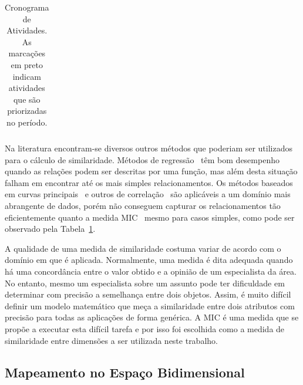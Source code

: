 \begin{table}
    \caption[Cronograma de atividades]{Cronograma de Atividades. As marcações em preto        indicam atividades que são priorizadas no período.}
    \begin{center}
        \begin{tabular}{|c|c|c|c|c|c|c|}
        \end{tabular}
    \end{center}
    \label{tab:corrs}
\end{table}





Na literatura encontram-se diversos outros métodos que poderiam ser utilizados para o cálculo de similaridade. Métodos de regressão~\cite{Friedman2001, Cleveland1988, Stone1977} têm bom desempenho quando as relações podem ser descritas por uma função, mas além desta situação falham em encontrar até os mais simples relacionamentos. Os métodos baseados em curvas principais~\cite{Hastie1989, Tibshirani1992, Delicado2008} e outros de correlação~\cite{Reny1959, Breiman1985, Kosorok2009} são aplicáveis a um domínio mais abrangente de dados, porém não conseguem capturar os relacionamentos tão eficientemente quanto a medida MIC~\cite{Reshef2011} mesmo para casos simples, como pode ser observado pela Tabela~\ref{tab:corrs}.    

A qualidade de uma medida de similaridade costuma variar de acordo com o domínio em que é aplicada. Normalmente, uma medida é dita adequada quando há uma concordância entre o valor obtido e a opinião de um especialista da área. No entanto, mesmo um especialista sobre um assunto pode ter dificuldade em determinar com precisão a semelhança entre dois objetos. Assim, é muito difícil definir um modelo matemático que meça a similaridade entre dois atributos com precisão para todas as aplicações de forma genérica. A MIC é uma medida que se propõe a executar esta difícil tarefa e por isso foi escolhida como a medida de similaridade entre dimensões a ser utilizada neste trabalho. 


\subsection{Mapeamento no Espaço Bidimensional}


